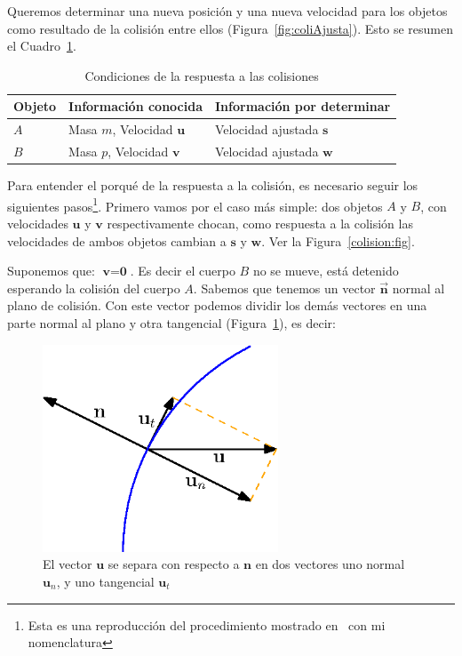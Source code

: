 Queremos determinar una nueva posición y una nueva velocidad para los objetos como resultado de la colisión entre ellos (Figura~\ref{fig:coliAjusta}).
Esto se resumen el Cuadro~\ref{condiciones:Colision}.

\begin{table}
\begin{center}
\begin{tabular} {@{}lll@{}}
\toprule
Objeto & Información conocida & Información por determinar \\
\midrule
$A$ & Masa $m$, Velocidad $\textbf{u}$ & Velocidad ajustada $\textbf{s}$ \\
$B$ & Masa $p$, Velocidad $\textbf{v}$ & Velocidad ajustada $\textbf{w}$ \\
\bottomrule
\end{tabular}
\end{center}
\caption{Condiciones de la respuesta a las colisiones}
\label{condiciones:Colision}
\end{table}

Para entender el porqué de la respuesta a la colisión, es necesario seguir los siguientes pasos\footnote{Esta es una reproducción del procedimiento mostrado en~\cite{FisicaMatematicasVideojuegos} con mi nomenclatura}.
Primero vamos por el caso más simple: dos objetos $A$ y $B$, con velocidades $\textbf{u}$ y $\textbf{v}$ respectivamente chocan, como respuesta a la colisión las velocidades de ambos objetos cambian a $\textbf{s}$ y $\textbf{w}$.
Ver la Figura~\ref{colision:fig}.

Suponemos que: $\textbf{v} = \textbf{0}$. Es decir el cuerpo $B$ no se mueve, está detenido esperando la colisión del cuerpo $A$. Sabemos que tenemos un vector $\vec{\textbf{n}}$ normal al plano de colisión.
Con este vector podemos dividir los demás vectores en una parte normal al plano y otra tangencial  (Figura~\ref{comVec:fig}), es decir:

\begin{figure}
 \centering
 \includegraphics[width=7cm]{Img/02/vector_componente}
 \caption[Separar componente tangencial y normal de un vector]{ 
 El vector $\textbf{u}$ se separa con respecto a $\textbf{n}$ en dos vectores uno normal $\textbf{u}_n$, y uno tangencial $\textbf{u}_t$ 
 } \label{comVec:fig}
\end{figure}

